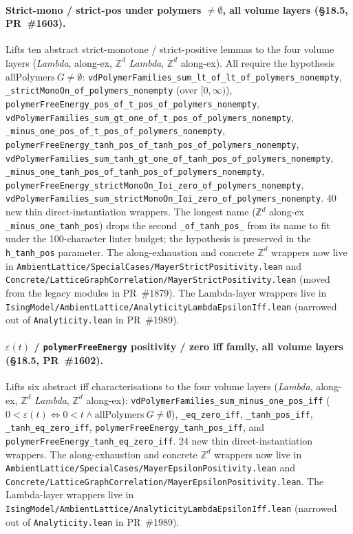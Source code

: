 \documentclass[a4paper,11pt]{article}
\begin{document}
\paragraph{Strict-mono / strict-pos under polymers $\ne
\emptyset$, all volume layers (\S18.5, PR~\#1603).} Lifts ten
abstract strict-monotone / strict-positive lemmas to the four
volume layers (\textit{Lambda}, along-ex, $\mathbb{Z}^d$
\textit{Lambda}, $\mathbb{Z}^d$ along-ex). All require the
hypothesis $\mathrm{allPolymers}\ G \ne \emptyset$:
\texttt{vdPolymerFamilies\_sum\_lt\_of\_lt\_of\_polymers\_nonempty},
\texttt{\_strictMonoOn\_of\_polymers\_nonempty} (over
$[0,\infty)$),
\texttt{polymerFreeEnergy\_pos\_of\_t\_pos\_of\_polymers\_nonempty},
\texttt{vdPolymerFamilies\_sum\_gt\_one\_of\_t\_pos\_of\_polymers\_nonempty},
\texttt{\_minus\_one\_pos\_of\_t\_pos\_of\_polymers\_nonempty},
\texttt{polymerFreeEnergy\_tanh\_pos\_of\_tanh\_pos\_of\_polymers\_nonempty},
\texttt{vdPolymerFamilies\_sum\_tanh\_gt\_one\_of\_tanh\_pos\_of\_polymers\_nonempty},
\texttt{\_minus\_one\_tanh\_pos\_of\_tanh\_pos\_of\_polymers\_nonempty},
\texttt{polymerFreeEnergy\_strictMonoOn\_Ioi\_zero\_of\_polymers\_nonempty},
\texttt{vdPolymerFamilies\_sum\_strictMonoOn\_Ioi\_zero\_of\_polymers\_nonempty}.
40 new thin direct-instantiation wrappers. The longest name
(ℤ$^d$ along-ex \texttt{\_minus\_one\_tanh\_pos}) drops the
second \texttt{\_of\_tanh\_pos\_} from its name to fit under the
100-character linter budget; the hypothesis is preserved in the
\texttt{h\_tanh\_pos} parameter. The along-exhaustion and concrete
$\mathbb{Z}^d$ wrappers now live in
\texttt{AmbientLattice/SpecialCases/MayerStrictPositivity.lean}
and
\texttt{Concrete/LatticeGraphCorrelation/MayerStrictPositivity.lean}
(moved from the legacy modules in PR~\#1879). The Lambda-layer
wrappers live in
\texttt{IsingModel/AmbientLattice/AnalyticityLambdaEpsilonIff.lean}
(narrowed out of \texttt{Analyticity.lean} in PR~\#1989).

\paragraph{$\varepsilon(t)$ / \texttt{polymerFreeEnergy}
positivity / zero iff family, all volume layers (\S18.5,
PR~\#1602).} Lifts six abstract iff characterisations to the
four volume layers (\textit{Lambda}, along-ex, $\mathbb{Z}^d$
\textit{Lambda}, $\mathbb{Z}^d$ along-ex):
\texttt{vdPolymerFamilies\_sum\_minus\_one\_pos\_iff}
($0 < \varepsilon(t) \Leftrightarrow 0 < t \wedge
\mathrm{allPolymers}\ G \ne \emptyset$),
\texttt{\_eq\_zero\_iff}, \texttt{\_tanh\_pos\_iff},
\texttt{\_tanh\_eq\_zero\_iff},
\texttt{polymerFreeEnergy\_tanh\_pos\_iff}, and
\texttt{polymerFreeEnergy\_tanh\_eq\_zero\_iff}. 24 new thin
direct-instantiation wrappers. The along-exhaustion and concrete
$\mathbb{Z}^d$ wrappers now live in
\texttt{AmbientLattice/SpecialCases/MayerEpsilonPositivity.lean}
and
\texttt{Concrete/LatticeGraphCorrelation/MayerEpsilonPositivity.lean}.
The Lambda-layer wrappers live in
\texttt{IsingModel/AmbientLattice/AnalyticityLambdaEpsilonIff.lean}
(narrowed out of \texttt{Analyticity.lean} in PR~\#1989).
\end{document}
